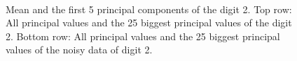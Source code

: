 \documentclass[a4paper, 12pt, titlepage]{article}
\begin{document}
\begin{figure}[H]
	\centering
	\\
	\caption{\protect{} Mean and the first 5 principal components of the digit 2. \protect{} Top row: All principal values and the 25 biggest principal values of the digit 2. Bottom row: All principal values and the 25 biggest principal values of the noisy data of digit 2.}
\end{figure}
\end{document}
